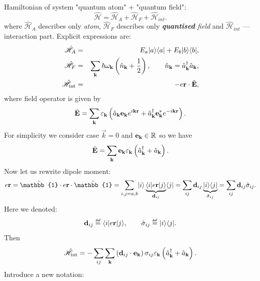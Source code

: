 Hamiltonian of system "quantum atom" $+$ "quantum field":
\begin{equation}
	\hat{\mathscr{H}} = \hat{\mathscr{H}}_A + \hat{\mathscr{H}}_F + \hat{\mathscr{H}}_{int}.
\end{equation}
where $\hat{\mathscr{H}}_A$ describes only \textit{atom}, $\hat{\mathscr{H}}_F$ describes only \textit{\textbf{quantised} field} and $\hat{\mathscr{H}}_{int}$ --- interaction part. Explicit expressions are:
\begin{eqnarray}
	\hat{\mathscr{H}}_A &=& E_a \lvert a\rangle \langle a\rvert + E_b \lvert b\rangle \langle b\rvert, \\
	\hat{\mathscr{H}}_F &=& \sum_{\mathbf{k}} \hbar \omega_{\mathbf{k}} \left( \hat{n}_{\mathbf{k}} + \frac{1}{2} \right), \qquad \hat{n}_{\mathbf{k}} = \hat{a}^{\dagger}_{\mathbf{k}} \hat{a}_{\mathbf{k}}, \\
	\hat{\mathscr{H}}_{\text{int}} &=& -e \mathbf{r} \cdot \hat{\mathbf{E}},
\end{eqnarray}
where field operator is given by
\begin{equation}
	\hat{\mathbf{E}} = \sum_{\mathbf{k}} \varepsilon_{\mathbf{k}} \left( \hat{a}_{\mathbf{k}} \mathbf{e}_{\mathbf{k}} e^{i \mathbf{k} \mathbf{r}} + \hat{a}^{\dagger}_{\mathbf{k}} \mathbf{e}^*_{\mathbf{k}} e^{-i \mathbf{k} \mathbf{r}} \right).
\end{equation}
For simplicity we consider case $\vec{k} = 0$ and $\mathbf{e}_{\mathbf{k}} \in \mathbb{R}$ so we have
\begin{equation}
	\hat{\mathbf{E}} = \sum_{\mathbf{k}} \mathbf{e}_{\mathbf{k}} \varepsilon_{\mathbf{k}} \left( \hat{a}^{\dagger}_{\mathbf{k}} + \hat{a}_{\mathbf{k}} \right).
\end{equation}
Now let us rewrite dipole moment:
\begin{equation}
	e \vec{r} = \hat{\mathbb{1}} \cdot e \vec{r} \cdot \hat{\mathbb{1}} = \sum_{i,j = a,b} \ket{i} \underbrace{\bra{i}  e \vec{r} \ket{j}}_{\vec{d}_{ij}} \bra{j} = \sum_{ij} \vec{d}_{ij} \underbrace{\ket{i} \bra{j}}_{\hat{\sigma}_{ij}} = \sum_{ij} \vec{d}_{ij} \hat{\sigma}_{ij}.
\end{equation}
Here we denoted:
\begin{equation}
	\vec{d}_{ij} \myeq \bra{i}  e \vec{r} \ket{j}, \qquad \hat{\sigma}_{ij} \myeq  \ket{i} \bra{j}.
\end{equation}
Then 
\begin{equation}
	\hat{\mathscr{H}}_{\text{int}} = - \sum_{ij} \sum_{\mathbf{k}} \left(\mathbf{d}_{ij} \cdot \mathbf{e}_{\mathbf{k}}\right) \sigma_{ij} \varepsilon_{\mathbf{k}} \left( \hat{a}^{\dagger}_{\mathbf{k}} + \hat{a}_{\mathbf{k}} \right).
\end{equation}
Introduce a new notation:
